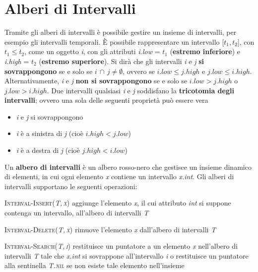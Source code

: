 \documentclass[10pt, a4paper]{report}
\begin{document}
\section{Alberi di Intervalli}
Tramite gli alberi di intervalli è possibile gestire un insieme di intervalli, per esempio gli intervalli temporali. È possibile rappresentare un intervallo [$t_1$,\,$t_2$], con $t_1 \leq t_2$, come un oggetto \textit{i}, con gli attributi \textit{i.low} = $t_1$ (\textbf{estremo inferiore}) e \textit{i.high} = $t_2$ (\textbf{estremo superiore}). Si dirà che gli intervalli \textit{i} e \textit{j} \textbf{si sovrappongono} se e solo se $i \,\cap\, j \neq \emptyset$, ovvero se $i.low \leq j.high$ e $j.low \leq i.high$. Alternativamente, \textit{i} e \textit{j} \textbf{non si sovrappongono} se e solo se $i.low > j.high$ o $j.low > i.high$. Due intervalli qualsiasi \textit{i} e \textit{j} soddisfano la \textbf{tricotomia degli intervalli}; ovvero una sola delle seguenti proprietà può essere vera
\begin{itemize}
\item\textit{i} e \textit{j} si sovrappongono
\item\textit{i} è a sinistra di \textit{j} (cioè $i.high < j.low$)
\item\textit{i} è a destra di \textit{j} (cioè $j.high < i.low$)
\end{itemize}
Un \textbf{albero di intervalli} è un albero rosso-nero che gestisce un insieme dinamico di elementi, in cui ogni elemento \textit{x} contiene un intervallo \textit{x.int}. Gli alberi di intervalli supportano le seguenti operazioni:
\begin{description}
\item\textsc{Interval-Insert(\textit{T,\,\textit{x}})} aggiunge l'elemento \textit{x}, il cui attributo \textit{int} si suppone contenga un intervallo, all'albero di intervalli \textit{T}
\item\textsc{Interval-Delete(\textit{T,\,\textit{x}})} rimuove l'elemento \textit{x} dall'albero di intervalli \textit{T}
\item\textsc{Interval-Search(\textit{T,\,\textit{i}})} restituisce un puntatore a un elemento \textit{x} nell'albero di intervalli \textit{T} tale che \textit{x.int} si sovrappone all'intervallo \textit{i} o  restituisce un puntatore alla sentinella \textit{T.\textsc{nil}} se non esiste tale elemento nell'insieme
\end{description}
\end{document}

